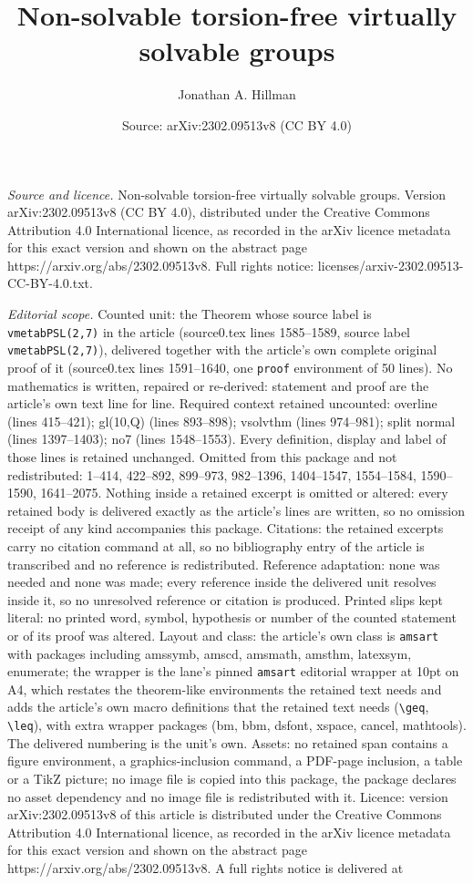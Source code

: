 \documentclass[10pt,a4paper]{amsart}
\title[Non-solvable torsion-free virtually solvable groups]{Non-solvable torsion-free virtually solvable groups}
\author{Jonathan A. Hillman}
\date{Source: arXiv:2302.09513v8 (CC BY 4.0)}
\begin{document}
\maketitle

\noindent\emph{Source and licence.} Non-solvable torsion-free virtually solvable groups. Version arXiv:2302.09513v8 (CC BY 4.0), distributed under the Creative Commons Attribution 4.0 International licence, as recorded in the arXiv licence metadata for this exact version and shown on the abstract page https://arxiv.org/abs/2302.09513v8. Full rights notice: licenses/arxiv-2302.09513-CC-BY-4.0.txt.\par\smallskip

\noindent\textit{Editorial scope.} Counted unit: the Theorem whose source label is \texttt{vmetabPSL(2,7)} in the article (source0.tex lines 1585--1589, source label \texttt{vmetabPSL(2,7)}), delivered together with the article's own complete original proof of it (source0.tex lines 1591--1640, one \texttt{proof} environment of 50 lines). No mathematics is written, repaired or re-derived: statement and proof are the article's own text line for line. Required context retained uncounted: overline (lines 415--421); gl(10,Q) (lines 893--898); vsolvthm (lines 974--981); split normal (lines 1397--1403); no7 (lines 1548--1553). Every definition, display and label of those lines is retained unchanged. Omitted from this package and not redistributed: 1--414, 422--892, 899--973, 982--1396, 1404--1547, 1554--1584, 1590--1590, 1641--2075. Nothing inside a retained excerpt is omitted or altered: every retained body is delivered exactly as the article's lines are written, so no omission receipt of any kind accompanies this package. Citations: the retained excerpts carry no citation command at all, so no bibliography entry of the article is transcribed and no reference is redistributed. Reference adaptation: none was needed and none was made; every reference inside the delivered unit resolves inside it, so no unresolved reference or citation is produced. Printed slips kept literal: no printed word, symbol, hypothesis or number of the counted statement or of its proof was altered. Layout and class: the article's own class is \texttt{amsart} with packages including amssymb, amscd, amsmath, amsthm, latexsym, enumerate; the wrapper is the lane's pinned \texttt{amsart} editorial wrapper at 10pt on A4, which restates the theorem-like environments the retained text needs and adds the article's own macro definitions that the retained text needs (\texttt{\textbackslash geq}, \texttt{\textbackslash leq}), with extra wrapper packages (bm, bbm, dsfont, xspace, cancel, mathtools). The delivered numbering is the unit's own. Assets: no retained span contains a figure environment, a graphics-inclusion command, a PDF-page inclusion, a table or a TikZ picture; no image file is copied into this package, the package declares no asset dependency and no image file is redistributed with it. Licence: version arXiv:2302.09513v8 of this article is distributed under the Creative Commons Attribution 4.0 International licence, as recorded in the arXiv licence metadata for this exact version and shown on the abstract page https://arxiv.org/abs/2302.09513v8. A full rights notice is delivered at 
\end{document}
